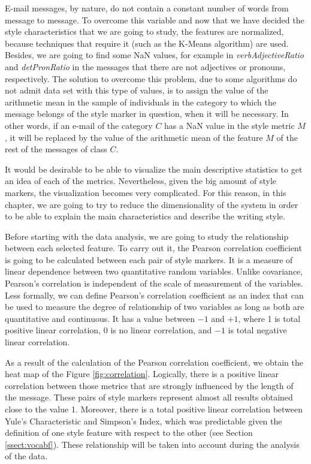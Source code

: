 E-mail messages, by nature, do not contain a constant number of words from message to message. To overcome this variable and now that we have decided the style characteristics that we are going to study, the features are normalized, because techniques that require it (such as the K-Means algorithm) are used. Besides, we are going to find some NaN values, for example in \textit{verbAdjectiveRatio} and \textit{detPronRatio} in the messages that there are not adjectives or pronouns, respectively. The solution to overcome this problem, due to some algorithms do not admit data set with this type of values, is to assign the value of the arithmetic mean in the sample of individuals in the category to which the message belongs of the style marker in question, when it will be necessary. In other words, if an e-mail of the category $C$ has a NaN value in the style metric $M$, it will be replaced by the value of the arithmetic mean of the feature $M$ of the rest of the messages of class $C$.

It would be desirable to be able to visualize the main descriptive statistics to get an idea of each of the metrics. Nevertheless, given the big amount of style markers, the visualization becomes very complicated. For this reason, in this chapter, we are going to try to reduce the dimensionality of the system in order to be able to explain the main characteristics and describe the writing style.

Before starting with the data analysis, we are going to study the relationship between each selected feature. To carry out it, the Pearson correlation coefficient \citep{benesty2009pearson} is going to be calculated between each pair of style markers. It is a measure of linear dependence between two quantitative random variables. Unlike covariance, Pearson's correlation is independent of the scale of measurement of the variables. Less formally, we can define Pearson's correlation coefficient as an index that can be used to measure the degree of relationship of two variables as long as both are quantitative and continuous. It has a value between $-1$ and $+1$, where 1 is total positive linear correlation, $0$ is no linear correlation, and $-1$ is total negative linear correlation.

As a result of the calculation of the Pearson correlation coefficient, we obtain the heat map of the Figure \ref{fig:correlation}. Logically, there is a positive linear correlation between those metrics that are strongly influenced by the length of the message. These pairs of style markers represent almost all results obtained close to the value 1. Moreover, there is a total positive linear correlation between Yule's Characteristic and Simpson's Index, which was predictable given the definition of one style feature with respect to the other (see Section \ref{ssect:vocabf}). These relationship will be taken into account during the analysis of the data.